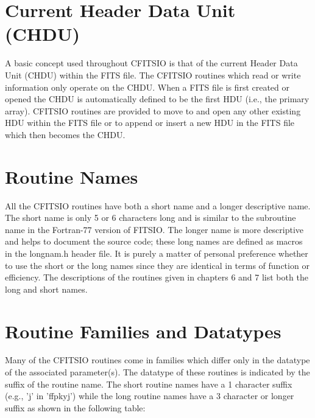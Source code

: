 \section{Current Header Data Unit (CHDU)}

A basic concept used throughout CFITSIO is that of the current Header
Data Unit (CHDU) within the FITS file. The CFITSIO routines which read
or write information only operate on the CHDU.  When a FITS file is first
created or opened the CHDU is automatically defined to be the first HDU
(i.e., the primary array).  CFITSIO routines are provided to move
to and open any other existing HDU within the FITS file or to append or
insert a new HDU in the FITS file which then becomes the CHDU.


\section{Routine Names}

All the CFITSIO routines have both a short name and a longer
descriptive name.  The short name is only 5 or 6 characters long and is
similar to the subroutine name in the Fortran-77 version of FITSIO.
The longer name is more descriptive and helps to document the source
code; these long names are defined as macros in the longnam.h header
file.  It is purely a matter of personal preference whether to use the
short or the long names since they are identical in terms of function
or efficiency.  The descriptions of the routines given in chapters 6
and 7 list both the long and short names.


\section{Routine Families and Datatypes}

Many of the CFITSIO routines come in families which differ only in the
datatype of the associated parameter(s).  The datatype of these
routines is indicated by the suffix of the routine name.  The short
routine names have a 1 character suffix (e.g., 'j' in 'ffpkyj')
while the long routine names have a 3 character or longer suffix
as shown in the following table:

